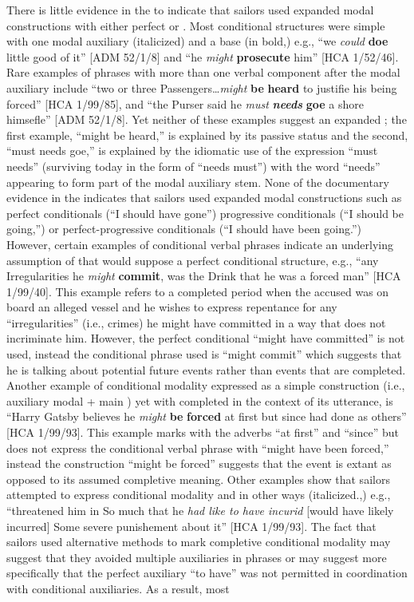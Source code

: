 There is little evidence in the  to indicate that sailors used expanded modal constructions with either perfect or . Most conditional structures were simple with one modal auxiliary (italicized) and a base  (in bold,) e.g., “we \textit{could} \textbf{doe} little good of it” [ADM 52/1/8] and “he \textit{might} \textbf{prosecute} him” [HCA 1/52/46]. Rare examples of  phrases with more than one verbal component after the modal auxiliary include “two or three Passengers…\textit{might} \textbf{be} \textbf{heard} to justifie his being forced” [HCA 1/99/85], and “the Purser said he \textit{must} \textbf{\textit{needs}} \textbf{goe} a shore himsefle” [ADM 52/1/8]. Yet neither of these examples suggest an expanded ; the first example, “might be heard,” is explained by its passive status and the second, “must needs goe,” is explained by the idiomatic use of the expression “must needs” (surviving today in the form of “needs must”) with the word “needs” appearing to form part of the modal auxiliary stem. None of the documentary evidence in the  indicates that sailors used expanded modal constructions such as perfect conditionals (“I should have gone”) progressive conditionals (“I should be going,”) or perfect-progressive conditionals (“I should have been going.”) However, certain examples of conditional verbal phrases indicate an underlying assumption of  that would suppose a perfect conditional structure, e.g., “any Irregularities he \textit{might} \textbf{commit}, was the Drink that he was a forced man” [HCA 1/99/40]. This example refers to a completed period when the accused was on board an alleged  vessel and he wishes to express repentance for any “irregularities” (i.e., crimes) he might have committed in a way that does not incriminate him. However, the perfect conditional “might have committed” is not used, instead the conditional phrase used is “might commit” which suggests that he is talking about potential future events rather than events that are completed. Another example of conditional modality expressed as a simple construction (i.e., auxiliary modal + main ) yet with completed  in the context of its utterance, is “Harry Gatsby believes he \textit{might} \textbf{be} \textbf{forced} at first but since had done as others” [HCA 1/99/93]. This example marks  with the adverbs “at first” and “since” but does not express the conditional verbal phrase with  “might have been forced,” instead the construction “might be forced” suggests that the event is extant as opposed to its assumed completive meaning. Other examples show that sailors attempted to express conditional modality and  in other ways (italicized.,) e.g., “threatened him in So much that he \textit{had like to have incurid} [would have likely incurred] Some severe punishement about it” [HCA 1/99/93]. The fact that sailors used alternative methods to mark completive conditional modality may suggest that they avoided multiple auxiliaries in  phrases or may suggest more specifically that the perfect auxiliary “to have” was not permitted in coordination with conditional auxiliaries. As a result, most 